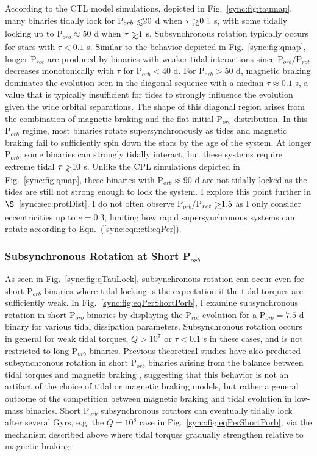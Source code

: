 According to the CTL model simulations, depicted in Fig.~\ref{sync:fig:taumap}, many binaries tidally lock for P$_{orb} \lsim 20$ d when $\tau \gsim 0.1$ s, with some tidally locking up to P$_{orb} \approx 50$ d when $\tau \gsim 1$ s. Subsynchronous rotation typically occurs for stars with $\tau < 0.1$ s. Similar to the behavior depicted in Fig.~\ref{sync:fig:qmap}, longer P$_{rot}$ are produced by binaries with weaker tidal interactions since P$_{orb}/$P$_{rot}$ decreases monotonically with $\tau$ for P$_{orb} < 40$ d.  For P$_{orb} > 50$ d, magnetic braking dominates the evolution seen in the diagonal sequence with a median $\tau \approx 0.1$ s, a value that is typically insufficient for tides to strongly influence the evolution given the wide orbital separations. The shape of this diagonal region arises from the combination of magnetic braking and the flat initial P$_{orb}$ distribution. In this P$_{orb}$ regime, most binaries rotate supersynchronously as tides and magnetic braking fail to sufficiently spin down the stars by the age of the system. At longer P$_{orb}$, some binaries can strongly tidally interact, but these systems require extreme tidal $\tau \gsim 10$ s. Unlike the CPL simulations depicted in Fig.~\ref{sync:fig:qmap}, these binaries with P$_{orb} \approx 90$ d are not tidally locked as the tides are still not strong enough to lock the system. I explore this point further in $\S$~\ref{sync:sec:protDist}. I do not often observe P$_{orb}/$P$_{rot} \gsim 1.5$ as I only consider eccentricities up to $e = 0.3$, limiting how rapid supersynchronous systems can rotate according to Eqn.~(\ref{sync:eqn:ctl:eqPer}).


\subsubsection{Subsynchronous Rotation at Short P$_{orb}$} \label{sync:sec:shortPorbSubSync}

As seen in Fig.~\ref{sync:fig:qTauLock}, subsynchronous rotation can occur even for short P$_{orb}$ binaries where tidal locking is the expectation if the tidal torques are sufficiently weak. In Fig.~\ref{sync:fig:eqPerShortPorb}, I examine subsynchronous rotation in short P$_{orb}$ binaries by displaying the P$_{rot}$ evolution for a P$_{orb} = 7.5$ d binary for various tidal dissipation parameters. Subsynchronous rotation occurs in general for weak tidal torques, $Q>10^7$ or $\tau < 0.1$ s in these cases, and is not restricted to long P$_{orb}$ binaries. Previous theoretical studies have also predicted subsynchronous rotation in short P$_{orb}$ binaries arising from the balance between tidal torques and magnetic braking \citep[e.g.][]{Habets1989,Zahn1994,Keppens1997}, suggesting that this behavior is not an artifact of the choice of tidal or magnetic braking models, but rather a general outcome of the competition between magnetic braking and tidal evolution in low-mass binaries.  Short P$_{orb}$ subsynchronous rotators can eventually tidally lock after several Gyrs, e.g. the $Q=10^8$ case in Fig.~\ref{sync:fig:eqPerShortPorb}, via the mechanism described above where tidal torques gradually strengthen relative to magnetic braking. 

